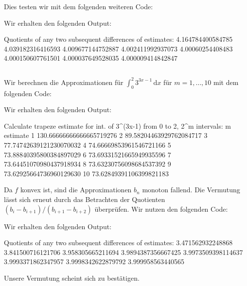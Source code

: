 Dies testen wir mit dem folgenden weiteren Code:



Wir erhalten den folgenden Output:

\begin{consoleoutput}
Quotients of any two subsequent differences of estimates:
4.164784400584785
4.039182316416593
4.009677144752887
4.002411992937073
4.00060254408483
4.000150607761501
4.000037649528035
4.000009414842847
\end{consoleoutput}





\subsection{}

Wir berechnen die Approximationen für $\int_0^2 3^{3x-1} \,\text{d}x$ für $m = 1, \dotsc, 10$ mit dem folgenden Code:



Wir erhalten den folgenden Output:

\begin{consoleoutput}
Calculate trapeze estimate for int. of 3^(3x-1) from 0 to 2, 2^m intervals:
 m      estimate
 1      130.66666666666665719276
 2       89.58204463929762084717
 3       77.74742639121230070032
 4       74.66669853961546721166
 5       73.88840395800384897029
 6       73.69331521665949935596
 7       73.64451070980437918934
 8       73.63230756098684537392
 9       73.62925664736960129630
10       73.62849391106399821183
\end{consoleoutput}


Da $f$ konvex ist, sind die Approximationen $b_n$ monoton fallend.
Die Vermutung lässt sich erneut durch das Betrachten der Quotienten $(b_i - b_{i+1})/(b_{i+1} - b_{i+2})$ überprüfen.
Wir nutzen den folgenden Code:



Wir erhalten den folgenden Output:

\begin{consoleoutput}
Quotients of any two subsequent differences of estimates:
3.471562932248868
3.841500716121706
3.958305665211694
3.9894387356667425
3.9973509398114637
3.9993371862347957
3.9998342622879792
3.999958563440565
\end{consoleoutput}

Unsere Vermutung scheint sich zu bestätigen.
